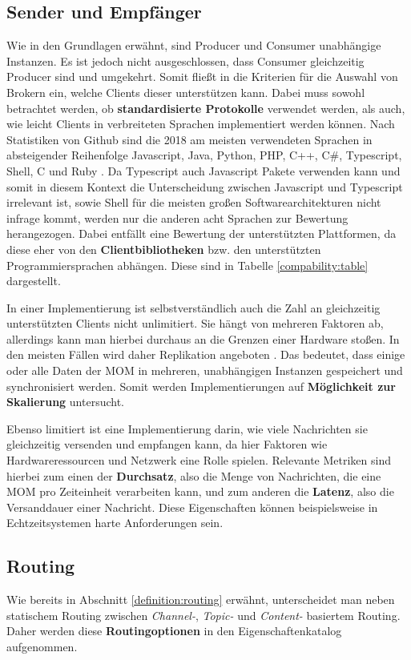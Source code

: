 \subsection{Sender und Empfänger}
Wie in den Grundlagen erwähnt, sind Producer und Consumer unabhängige Instanzen.
Es ist jedoch nicht ausgeschlossen, dass Consumer gleichzeitig Producer sind und
umgekehrt. Somit fließt in die Kriterien für die Auswahl von Brokern ein, welche
Clients dieser unterstützen kann. 
Dabei muss sowohl betrachtet werden, ob \textbf{standardisierte Protokolle}
verwendet werden, als auch, wie leicht Clients in verbreiteten Sprachen
implementiert werden können.
Nach Statistiken von Github sind die 2018 am meisten verwendeten Sprachen in
absteigender Reihenfolge Javascript, Java, Python, PHP, C++, C\#, Typescript,
Shell, C und Ruby \cite{Octoverse:online}.
Da Typescript auch Javascript Pakete verwenden kann und somit
in diesem Kontext die Unterscheidung zwischen Javascript und Typescript
irrelevant ist, sowie Shell für die meisten großen Softwarearchitekturen nicht
infrage kommt, werden nur die anderen acht Sprachen zur Bewertung herangezogen. Dabei entfällt
eine Bewertung der unterstützten Plattformen, da diese eher von den
\textbf{Clientbibliotheken} bzw. den unterstützten Programmiersprachen abhängen.
Diese sind in Tabelle \ref{compability:table} dargestellt.

In einer Implementierung ist selbstverständlich auch die Zahl an
gleichzeitig unterstützten Clients nicht unlimitiert. Sie hängt von mehreren
Faktoren ab, allerdings kann man hierbei durchaus an die Grenzen einer
Hardware stoßen.
In den meisten Fällen wird daher Replikation angeboten
\cite{ApacheKa84:online,RabbitMQ:online}. Das bedeutet, dass
einige oder alle Daten der MOM in mehreren, unabhängigen Instanzen gespeichert
und synchronisiert werden. Somit werden Implementierungen auf \textbf{Möglichkeit
zur Skalierung} untersucht.

Ebenso limitiert ist eine Implementierung darin, wie viele Nachrichten sie
gleichzeitig versenden und empfangen kann, da hier Faktoren wie
Hardwareressourcen und Netzwerk eine Rolle spielen.
Relevante Metriken sind hierbei zum einen der \textbf{Durchsatz}, also die Menge
von Nachrichten, die eine MOM pro Zeiteinheit verarbeiten kann, und zum anderen
die \textbf{Latenz}, also die Versanddauer einer Nachricht. Diese Eigenschaften
können beispielsweise in Echtzeitsystemen harte Anforderungen sein.

\subsection{Routing}
Wie bereits in Abschnitt \ref{definition:routing} erwähnt, unterscheidet
man neben statischem Routing zwischen \textit{Channel-}, \textit{Topic-} und
\textit{Content-} basiertem Routing. Daher werden diese \textbf{Routingoptionen}
in den Eigenschaftenkatalog aufgenommen.

